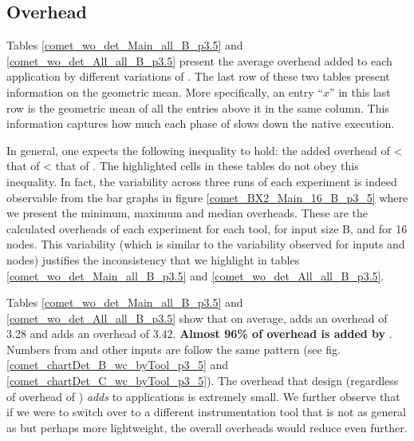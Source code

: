   
\subsection{ \pininit Overhead} 
\label{subsec:pinit}

Tables \ref{comet_wo_det_Main_all_B_p3.5} and
\ref{comet_wo_det_All_all_B_p3.5} present the average overhead added to each
application by different variations of \parlot. 
%
The last row of these two tables
present information on the geometric mean.
%
More specifically, an entry ``$x$'' in this last row
is the geometric mean of all
the entries above it in the same column.
%
This information captures how much each
phase of \parlot slows down the native execution. 


In general, one 
expects the following inequality to hold:
 the added overhead of \pininit < that of \parlot
< that of \parlotnc. 
%
The highlighted cells in these tables do not
obey this inequality.
%
In fact, the variability across three runs of each experiment
is indeed observable from the bar graphs in figure \ref{comet_BX2_Main_16_B_p3_5}
where we present the minimum, maximum and median overheads.
%
These are the calculated
overheads of each experiment for each tool, for input size B, and for 16
nodes. 
%
This variability (which is similar to the variability observed for inputs and nodes)
justifies the inconsistency that we highlight in  tables
\ref{comet_wo_det_Main_all_B_p3.5} and
\ref{comet_wo_det_All_all_B_p3.5}.


Tables \ref{comet_wo_det_Main_all_B_p3.5} and
\ref{comet_wo_det_All_all_B_p3.5} show that on average, \pininit adds
an overhead of 3.28  and \parlota adds an overhead of 3.42. 
%
\textbf{Almost 96\%
of \parlota overhead is added by \pininit}. 
%
Numbers from \parlotm and
other inputs are follow the same pattern
(see fig. \ref{comet_chartDet_B_wc_byTool_p3_5} and \ref{comet_chartDet_C_wc_byTool_p3_5}). 
%
The overhead that \parlot design (regardless of overhead of \pininit) {\em adds}
to applications is extremely small.
%
We further observe that if we were to switch over to a different
instrumentation tool that is not as general as \pin but perhaps more
lightweight, the overall overheads would reduce even further. \\






